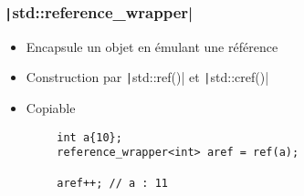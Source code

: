 \documentclass[C++.tex]{subfiles}
\begin{document}
\begin{frame}[fragile]
	\frametitle{\texttt|std::reference_wrapper|}
	\begin{itemize}
		\item Encapsule un objet en émulant une référence
		\item Construction par \texttt|std::ref()| et \texttt|std::cref()|
		\item Copiable
	\end{itemize}

	\begin{verbatim}
		int a{10};
		reference_wrapper<int> aref = ref(a);

		aref++; // a : 11
	\end{verbatim}

\end{frame}
\end{document}
